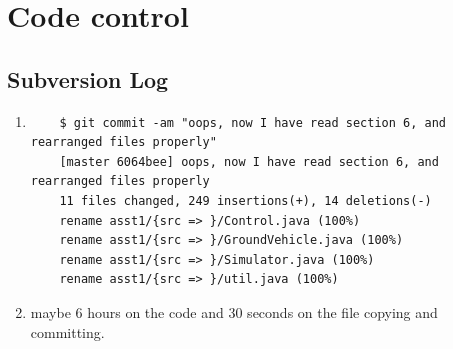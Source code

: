 \documentclass{article}
\begin{document}
\section{Code control}
\subsection{Subversion Log}
\begin{enumerate}
	\item
	\begin{verbatim}
	$ git commit -am "oops, now I have read section 6, and rearranged files properly"
	[master 6064bee] oops, now I have read section 6, and rearranged files properly
	11 files changed, 249 insertions(+), 14 deletions(-)
	rename asst1/{src => }/Control.java (100%)
	rename asst1/{src => }/GroundVehicle.java (100%)
	rename asst1/{src => }/Simulator.java (100%)
	rename asst1/{src => }/util.java (100%)
	\end{verbatim}
	\item maybe 6 hours on the code and 30 seconds on the file copying and committing.
\end{enumerate}
\end{document}
